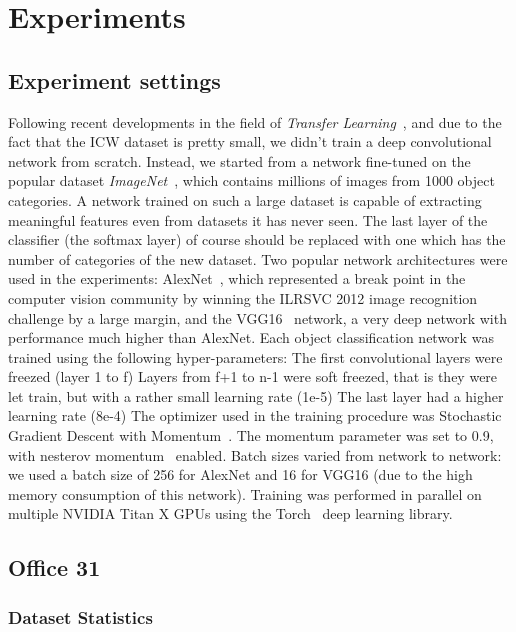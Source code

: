 \documentclass[../main.tex]{subfiles}
\begin{document}
    \chapter{Experiments}

    \section{Experiment settings}
    Following recent developments in the field of \textit{Transfer Learning}~\cite{transfer-learning}, and due to the fact that
    the ICW dataset is pretty small, we didn't train a deep convolutional network from scratch. Instead, we started from a network
    fine-tuned on the popular dataset \textit{ImageNet}~\cite{imagenet}, which contains millions of images from 1000 object categories.
    A network trained on such a large dataset is capable of extracting meaningful features even from datasets it has never seen.
    The last layer of the classifier (the softmax layer) of course should be replaced with one which has the number of categories of the new dataset.
    Two popular network architectures were used in the experiments: AlexNet~\cite{alexnet}, which represented a break point in the computer vision
    community by winning the ILRSVC 2012 image recognition challenge by a large margin, and the VGG16~\cite{vgg16} network, a very deep network
    with performance much higher than AlexNet.
    Each object classification network was trained using the following hyper-parameters:
    The first convolutional layers were freezed (layer 1 to f)
    Layers from f+1 to n-1 were soft freezed, that is they were let train, but with a rather small learning rate (1e-5)
    The last layer had a higher learning rate (8e-4)
    The optimizer used in the training procedure was Stochastic Gradient Descent with Momentum~\cite{momentum}. The momentum parameter
    was set to 0.9, with nesterov momentum~\cite{nesterov-momentum} enabled.
    Batch sizes varied from network to network: we used a batch size of 256 for AlexNet and 16 for VGG16 (due to the high memory
    consumption of this network).
    Training was performed in parallel on multiple NVIDIA Titan X GPUs using the Torch~\cite{torch7} deep learning library.

    \section{Office 31}
    \subsection{Dataset Statistics}
\end{document}
